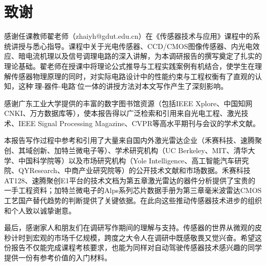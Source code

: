 \documentclass[12pt,a4paper,openany,UTF8]{ctexbook}
\begin{document}
\clearpage

\chapter*{\heiti 致\quad 谢}

感谢任课教师翟老师（zhaiyh@gdut.edu.cn）在《传感器技术与应用》课程中的系统讲授与悉心指导。课程中关于光电传感器、CCD/CMOS图像传感器、内光电效应、暗电流机理以及信号调理电路的深入讲解，为本调研报告的撰写奠定了扎实的理论基础。翟老师在授课中将理论公式推导与工程实践案例有机结合，使学生在理解传感器物理原理的同时，对实际电路设计中的性能约束与工程权衡有了直观的认知，这种\"原理-器件-电路\"三位一体的讲授方法对本文写作产生了深刻影响。

感谢广东工业大学提供的丰富的数字图书馆资源（包括IEEE Xplore、中国知网CNKI、万方数据库等），使本报告得以广泛检索和引用来自光电工程、激光技术、IEEE Signal Processing Magazine、CVPR等高水平期刊与会议的学术文献。

本报告写作过程中参考和引用了大量来自国内外激光雷达企业（禾赛科技、速腾聚创、其域创新、加特兰微电子等）、学术研究机构（UC Berkeley、MIT、清华大学、中国科学院等）以及市场研究机构（Yole Intelligence、高工智能汽车研究院、QYResearch、中商产业研究院等）的公开技术文献和市场数据。禾赛科技AT128、速腾聚创E1平台的技术文档为第五章激光雷达的器件分析提供了宝贵的一手工程资料；加特兰微电子的Alps系列芯片数据手册为第三章毫米波雷达CMOS工艺国产替代趋势的判断提供了关键依据。在此向这些推动传感器技术进步的组织和个人致以诚挚谢意。

最后，感谢家人和朋友们在调研写作期间的理解与支持。传感器的世界从微观的皮秒计时到宏观的市场千亿规模，跨度之大令人在调研中既感敬畏又觉兴奋。希望这份报告不仅能完成课程考核要求，也能为同样对自动驾驶传感器技术感兴趣的同学提供一份有参考价值的入门材料。

\clearpage
\end{document}
